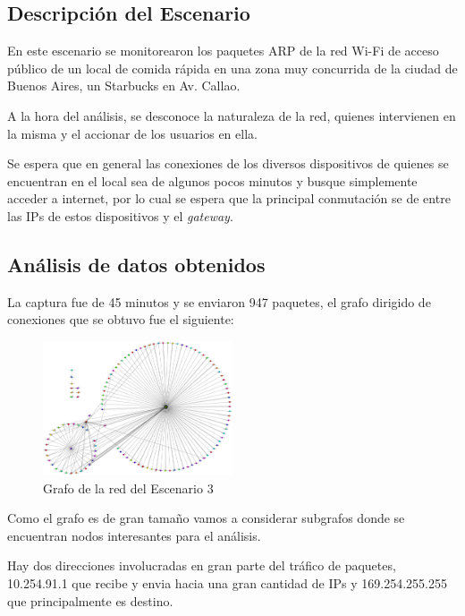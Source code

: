 \subsection{Descripci\'on del Escenario}
	\par En este escenario se monitorearon los paquetes ARP de la red Wi-Fi de acceso público de un local de comida rápida en una zona muy concurrida de la ciudad de Buenos Aires, un Starbucks en Av. Callao.

	\par A la hora del análisis, se desconoce la naturaleza de la red, quienes intervienen en la misma y el accionar de los usuarios en ella.
    
    \par Se espera que en general las conexiones de los diversos dispositivos de quienes se encuentran en el local sea de algunos pocos minutos y busque simplemente acceder a internet, por lo cual se espera que la principal conmutación se de entre las IPs de estos dispositivos y el \emph{gateway}.


\subsection{An\'alisis de datos obtenidos}
	\par La captura fue de 45 minutos y se enviaron 947 paquetes, el grafo dirigido de conexiones que se obtuvo fue el siguiente:

 
\begin{figure}[H]
		\centering
		\includegraphics[width=0.5\textwidth]{img/graph/escenario_3/starbucks2.eps}
		\caption{Grafo de la red del Escenario 3}
		\label{fig:grafo_escenario3}
	\end{figure}

		\par Como el grafo es de gran tamaño vamos a considerar subgrafos donde se encuentran nodos interesantes para el análisis.

	\par Hay dos direcciones involucradas en gran parte del tráfico de paquetes, 10.254.91.1 que  recibe y envia hacia una gran cantidad de IPs y 169.254.255.255 que principalmente es destino.

